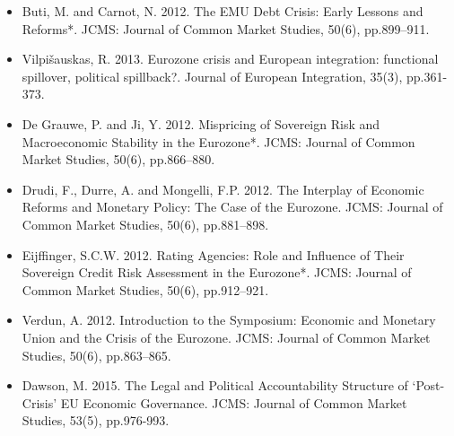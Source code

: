 \begin{itemize}
	\item Buti, M. and Carnot, N. 2012. The EMU Debt Crisis: Early Lessons and Reforms*. JCMS: Journal of Common Market Studies, 50(6), pp.899–911.
	\item Vilpišauskas, R. 2013. Eurozone crisis and European integration: functional spillover, political spillback?. Journal of European Integration, 35(3), pp.361-373.
	\item De Grauwe, P. and Ji, Y. 2012. Mispricing of Sovereign Risk and Macroeconomic Stability in the Eurozone*. JCMS: Journal of Common Market Studies, 50(6), pp.866–880.
	\item Drudi, F., Durre, A. and Mongelli, F.P. 2012. The Interplay of Economic Reforms and Monetary Policy: The Case of the Eurozone. JCMS: Journal of Common Market Studies, 50(6), pp.881–898.
	\item Eijffinger, S.C.W. 2012. Rating Agencies: Role and Influence of Their Sovereign Credit Risk Assessment in the Eurozone*. JCMS: Journal of Common Market Studies, 50(6), pp.912–921.
	\item Verdun, A. 2012. Introduction to the Symposium: Economic and Monetary Union and the Crisis of the Eurozone. JCMS: Journal of Common Market Studies, 50(6), pp.863–865.
	\item Dawson, M. 2015. The Legal and Political Accountability Structure of `Post-Crisis' EU Economic Governance. JCMS: Journal of Common Market Studies, 53(5), pp.976-993.
\end{itemize}